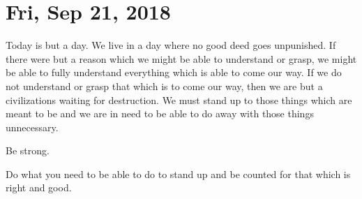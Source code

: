 \section{Fri, Sep 21, 2018}

Today is but a day. We live in a day where no good deed goes unpunished. If there
were but a reason which we might be able to understand or grasp, we might be able to
fully understand everything which is able to come our way. If we do not understand or
grasp that which is to come our way, then we are but a civilizations waiting for
destruction. We must stand up to those things which are meant to be and we are in
need to be able to do away with those things unnecessary.

Be strong.

Do what you need to be able to do to stand up and be counted for that which is right
and good.